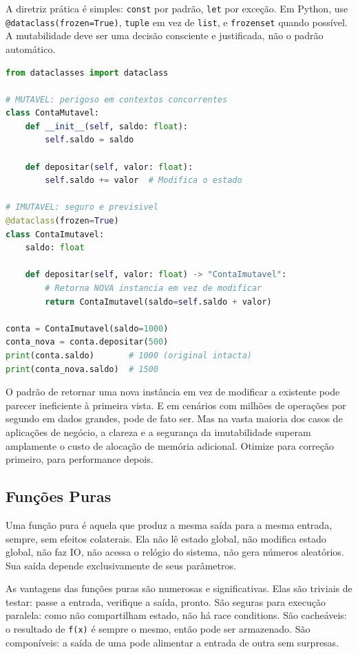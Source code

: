 A diretriz prática é simples: \texttt{const} por padrão, \texttt{let} por
exceção. Em Python, use \texttt{@dataclass(frozen=True)}, \texttt{tuple}
em vez de \texttt{list}, e \texttt{frozenset} quando possível. A mutabilidade
deve ser uma decisão consciente e justificada, não o padrão automático.

\begin{lstlisting}[language=Python, caption={Imutabilidade em Python}]
from dataclasses import dataclass

# MUTAVEL: perigoso em contextos concorrentes
class ContaMutavel:
    def __init__(self, saldo: float):
        self.saldo = saldo

    def depositar(self, valor: float):
        self.saldo += valor  # Modifica o estado

# IMUTAVEL: seguro e previsivel
@dataclass(frozen=True)
class ContaImutavel:
    saldo: float

    def depositar(self, valor: float) -> "ContaImutavel":
        # Retorna NOVA instancia em vez de modificar
        return ContaImutavel(saldo=self.saldo + valor)

conta = ContaImutavel(saldo=1000)
conta_nova = conta.depositar(500)
print(conta.saldo)       # 1000 (original intacta)
print(conta_nova.saldo)  # 1500
\end{lstlisting}

O padrão de retornar uma nova instância em vez de modificar a existente
pode parecer ineficiente à primeira vista. E em cenários com milhões de
operações por segundo em dados grandes, pode de fato ser. Mas na vasta
maioria dos casos de aplicações de negócio, a clareza e a segurança da
imutabilidade superam amplamente o custo de alocação de memória adicional.
Otimize para correção primeiro, para performance depois.

\subsection{Funções Puras}

Uma função pura é aquela que produz a mesma saída para a mesma entrada,
sempre, sem efeitos colaterais. Ela não lê estado global, não modifica
estado global, não faz IO, não acessa o relógio do sistema, não gera
números aleatórios. Sua saída depende exclusivamente de seus parâmetros.

As vantagens das funções puras são numerosas e significativas. Elas são
triviais de testar: passe a entrada, verifique a saída, pronto. São
seguras para execução paralela: como não compartilham estado, não há
race conditions. São cacheáveis: o resultado de \texttt{f(x)} é sempre o
mesmo, então pode ser armazenado. São componíveis: a saída de uma pode
alimentar a entrada de outra sem surpresas.

